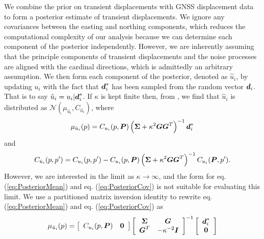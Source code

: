 \documentclass[extra,mreferee]{gji}
\begin{document}
We combine the prior on transient displacements with GNSS displacement data to form a posterior estimate of transient displacements. We ignore any covariances between the easting and northing components, which reduces the computational complexity of our analysis because we can determine each component of the posterior independently. However, we are inherently assuming that the principle components of transient displacements and the noise processes are aligned with the cardinal directions, which is admittedly an arbitrary assumption. We then form each component of the posterior, denoted as $\hat{u}_i$, by updating $u_i$ with the fact that $\mitbf{d}^*_i$ has been sampled from the random vector $\mitbf{d}_i$. That is to say $\hat{u}_i = u_i |\mitbf{d}^*_i$. If $\kappa$ is kept finite then, from \citet[sec. 2.2]{Rasmussen2006}, we find that $\hat{u}_i$ is distributed as $\mathcal{N}(\mu_{\hat{u}_i},C_{\hat{u}_i})$, where
\begin{equation}\label{eq:PosteriorMean}
\mu_{\hat{u}_i}(p) = C_{u_i}(p,\mitbf{P})\left(\mitbf{\Sigma} + \kappa^2\mitbf{G}\mitbf{G}^T\right)^{-1}\mitbf{d}^*_i
\end{equation}    
and
\begin{equation}\label{eq:PosteriorCov}
C_{\hat{u}_i}(p,p') = C_{u_i}(p,p') - C_{u_i}(p,\mitbf{P})\left(\mitbf{\Sigma} + \kappa^2\mitbf{G}\mitbf{G}^T\right)^{-1}C_{u_i}(\mitbf{P},p').
\end{equation}
However, we are interested in the limit as $\kappa \to \infty$, and the form for eq. (\ref{eq:PosteriorMean}) and eq. (\ref{eq:PosteriorCov}) is not suitable for evaluating this limit. We use a partitioned matrix inversion identity \citep[sec. 2.7.4]{Press2007} to rewrite eq. (\ref{eq:PosteriorMean}) and eq. (\ref{eq:PosteriorCov}) as
 \begin{equation}\label{eq:PosteriorMean2}
\mu_{\hat{u}_i}(p) = \left[\begin{array}{cc}
                         C_{u_i}(p,\mitbf{P}) & \mitbf{0} \\
                         \end{array}\right]
                   \left[\begin{array}{cc}
                         \mitbf{\Sigma} & \mitbf{G} \\
                         \mitbf{G}^T  & -\kappa^{-2} \mitbf{I} \\
                         \end{array}\right]^{-1}
                   \left[\begin{array}{c}
                         \mitbf{d}^*_i \\
                         \mitbf{0} \\
                         \end{array}\right]
\end{equation}    
\end{document}
